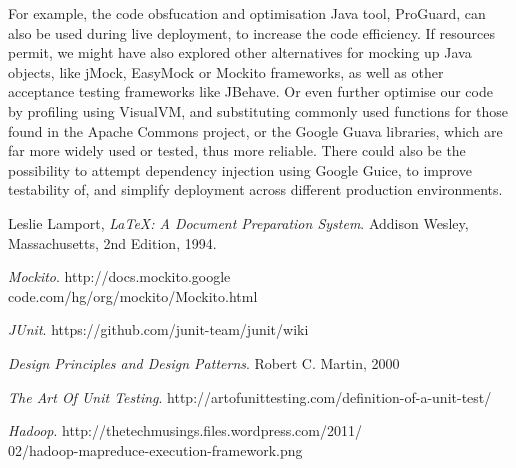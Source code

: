 \documentclass[11pt,twocolumn]{article} %
\begin{document}
For example, the code obsfucation and optimisation Java tool, ProGuard, can also be used
during live deployment, to increase the code efficiency. If resources permit, we might have
also explored other alternatives for mocking up Java objects, like jMock, EasyMock or
Mockito frameworks, as well as other acceptance testing frameworks like JBehave.
Or even further optimise our code by profiling using VisualVM, and substituting commonly
used functions for those found in the Apache Commons project, or the Google Guava
libraries, which are far more widely used or tested, thus more reliable. There could also be
the possibility to attempt dependency injection using Google Guice, to improve testability
of, and simplify deployment across different production environments.


\begin{thebibliography}{9}

  Leslie Lamport,
  \emph{\LaTeX: A Document Preparation System}.
  Addison Wesley, Massachusetts,
  2nd Edition,
  1994.

  \emph{Mockito}.
  http://docs.mockito.google\\code.com/hg/org/mockito/Mockito.html  

  \emph{JUnit}.
  https://github.com/junit-team/junit/wiki

  \emph{Design Principles and Design Patterns}.
  Robert C. Martin,
  2000

  \emph{The Art Of Unit Testing}.
  http://artofunittesting.com/definition-of-a-unit-test/

  \emph{Hadoop}.
  http://thetechmusings.files.wordpress.com/2011/\\02/hadoop-mapreduce-execution-framework.png
  
\end{thebibliography}
\end{document}
